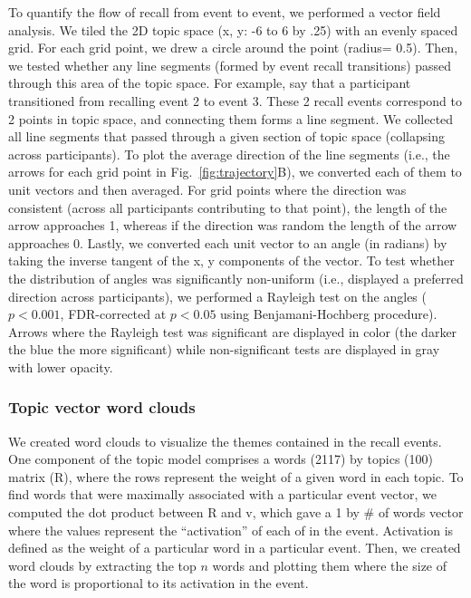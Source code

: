 \documentclass{article}
\begin{document}
To quantify the flow of recall from event to event, we performed a vector field analysis.  We tiled the 2D topic space (x, y: -6 to 6 by .25) with an evenly spaced grid. For each grid point, we drew a circle around the point (radius= 0.5). Then, we tested whether any line segments (formed by event recall transitions) passed through this area of the topic space.  For example, say that a participant transitioned from recalling event 2 to event 3. These 2 recall events correspond to 2 points in topic space, and connecting them forms a line segment. We collected all line segments that passed through a given section of topic space (collapsing across participants). To plot the average direction of the line segments (i.e., the arrows for each grid point in Fig.~\ref{fig:trajectory}B), we converted each of them to unit vectors and then averaged. For grid points where the direction was consistent (across all participants contributing to that point), the length of the arrow approaches 1, whereas if the direction was random the length of the arrow approaches 0. Lastly, we converted each unit vector to an angle (in radians) by taking the inverse tangent of the x, y components of the vector. To test whether the distribution of angles was significantly non-uniform (i.e., displayed a preferred direction across participants), we performed a Rayleigh test on the angles ($p < 0.001$, FDR-corrected at $p < 0.05$ using Benjamani-Hochberg procedure). Arrows where the Rayleigh test was significant are displayed in color (the darker the blue the more significant) while non-significant tests are displayed in gray with lower opacity.

\subsubsection*{Topic vector word clouds}
We created word clouds to visualize the themes contained in the recall events. One component of the topic model comprises a words (2117) by topics (100) matrix (R), where the rows represent the weight of a given word in each topic.  To find words that were maximally associated with a particular event vector, we computed the dot product between R and v, which gave a 1 by \# of words vector where the values represent the ``activation'' of each of in the event. Activation is defined as the weight of a particular word in a particular event. Then, we created word clouds by extracting the top $n$ words and plotting them where the size of the word is proportional to its activation in the event.
\end{document}
